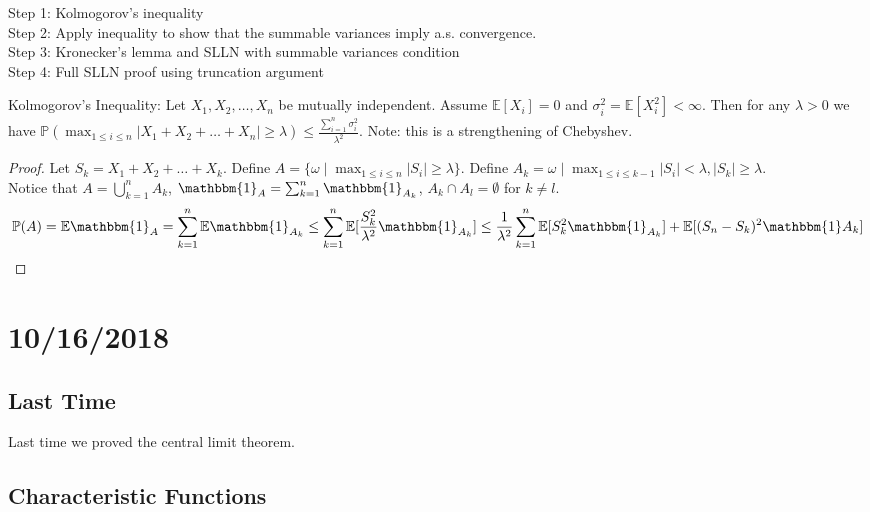 \documentclass[english, course]{Notes}
\begin{document}
Step 1: Kolmogorov's inequality\\
Step 2: Apply inequality to show that the summable variances imply a.s. convergence.\\
Step 3: Kronecker's lemma and SLLN with summable variances condition\\
Step 4: Full SLLN proof using truncation argument\\

\begin{theorem}
Kolmogorov's Inequality: Let $X_1, X_2, \dots, X_n$ be mutually independent. Assume $\mathbb{E}[X_i] = 0$ and $\sigma_i^2 = \mathbb{E}[X_i^2] < \infty$. Then for any $\lambda > 0$ we have $\mathbb{P}(\max_{1 \leq i \leq n} |X_1 + X_2 + \dots + X_n| \geq \lambda) \leq \frac{\sum_{i = 1}^n \sigma_i^2}{\lambda^2}$. Note: this is a strengthening of Chebyshev.
\end{theorem}

\begin{proof}
Let $S_k = X_1 + X_2 + \dots + X_k$. Define $A = \{\omega \mid \max_{1 \leq i \leq n} |S_i| \geq \lambda\}$. Define $A_k = \omega \mid \max_{1 \leq i \leq k-1} |S_i| < \lambda, |S_k| \geq \lambda$.\\

Notice that $A = \bigcup_{k = 1}^n A_k$, $\mathbbm{1}_A = \sum_{k=1}^n \mathbbm{1}_{A_k}$, $A_k \cap A_l = \emptyset$ for $k \neq l$.\\

\[\mathbb{P}(A) = \mathbb{E}\mathbbm{1}_A = \sum_{k = 1}^n \mathbb{E}\mathbbm{1}_{A_k} \leq \sum_{k = 1}^n \mathbb{E}[\frac{S_k^2}{\lambda^2} \mathbbm{1}_{A_k}] \leq \frac{1}{\lambda^2} \sum_{k=1}^n \mathbb{E}[S_k^2 \mathbbm{1}_{A_k}] + \mathbb{E}[(S_n - S_k)^2 \mathbbm{1}A_k]\]
\end{proof}

\section{10/16/2018}

\subsection{Last Time}

Last time we proved the central limit theorem.

\subsection{Characteristic Functions}
\end{document}
